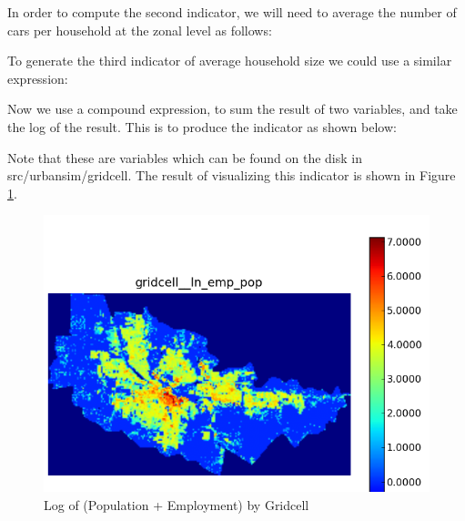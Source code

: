 In order to compute the second indicator, we will need to average the
number of cars per household at the zonal level as follows:


% 

To generate the third indicator of average household size we could use
a similar expression:


Now we use a compound expression, to sum the result of two variables,
and take the log of the result.  This is to produce the indicator as
shown below:


Note that these are variables which can be found on the disk in
src/urbansim/gridcell.  The result of visualizing this indicator is
shown in Figure \ref{fig:indicator-ln-emp-pop}.

\begin{figure}[htp]
\begin{center}
\includegraphics[scale=0.4]{graphics/indicator-ln-emp-pop.png}
\end{center}
\caption{Log of (Population + Employment) by Gridcell}
\label{fig:indicator-ln-emp-pop}
\end{figure}

